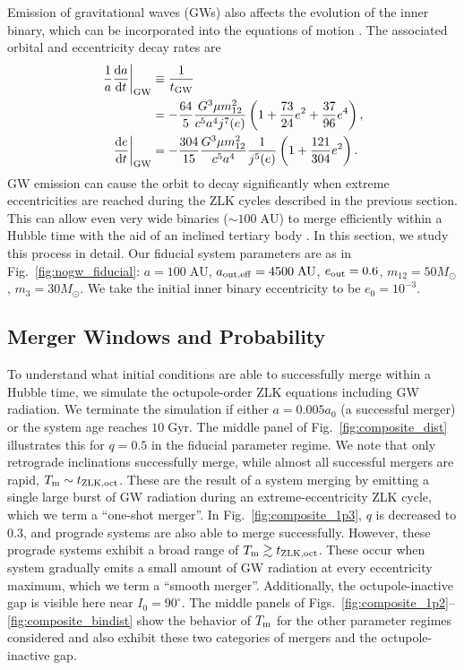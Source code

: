 \documentclass[
        fleqn,
        usenatbib,
    ]{mnras}
\newcommand*{\rd}[2]{\frac{\mathrm{d}#1}{\mathrm{d}#2}}
\newcommand*{\at}[1]{\left.#1\right|}
\newcommand*{\p}[1]{\left(#1\right)}
\begin{document}
Emission of gravitational waves (GWs) also affects the evolution of the inner
binary, which can be incorporated into the equations of motion
\citep{peters1964, LL18}. The associated orbital and eccentricity decay rates
are
\begin{align}
    \at{\frac{1}{a}\rd{a}{t}}_{\rm GW} &\equiv \frac{1}{t_{\rm GW}}\nonumber\\
        &= -\frac{64}{5}\frac{G^3 \mu m_{12}^2}{c^5a^4j^7(e)}
            \p{1 + \frac{73}{24}e^2 + \frac{37}{96}e^4}\label{eq:def_tgw},\\
    \at{\rd{e}{t}}_{\rm GW} &= -\frac{304}{15}\frac{G^3 \mu m_{12}^2}{c^5a^4}
        \frac{1}{j^{5}(e)}\p{1 + \frac{121}{304}e^2}\label{eq:dedt_gw}.
\end{align}
GW emission can cause the orbit to decay significantly when extreme
eccentricities are reached during the ZLK cycles described in the previous
section. This can allow even very wide binaries ($\sim 100\;\mathrm{AU}$) to
merge efficiently within a Hubble time with the aid of an inclined tertiary body
\citep{LL18, LL19}. In this section, we study this process in detail. Our
fiducial system parameters are as in Fig.~\ref{fig:nogw_fiducial}: $a =
100\;\mathrm{AU}$, $a_{\rm out, eff} = 4500\;\mathrm{AU}$, $e_{\rm out} = 0.6$,
$m_{12} = 50M_{\odot}$, $m_3 = 30M_{\odot}$. We take the initial inner binary
eccentricity to be $e_0 = 10^{-3}$.

\subsection{Merger Windows and Probability}\label{ss:windows}

To understand what initial conditions are able to successfully merge within a
Hubble time, we simulate the octupole-order ZLK equations including GW
radiation. We terminate the simulation if either $a = 0.005a_0$ (a successful
merger) or the system age reaches $10\;\mathrm{Gyr}$. The middle panel of
Fig.~\ref{fig:composite_dist} illustrates this for $q = 0.5$ in the fiducial
parameter regime. We note that only retrograde inclinations successfully merge,
while almost all successful mergers are rapid, $T_{\rm
m} \sim t_{\rm ZLK, oct}$. These are the result of a system merging by emitting
a single large burst of GW radiation during an extreme-eccentricity ZLK cycle,
which we term a ``one-shot merger''. In Fig.~\ref{fig:composite_1p3}, $q$ is
decreased to $0.3$, and prograde systems are also able to merge successfully.
However, these prograde systems exhibit a broad range of $T_{\rm m} \gtrsim
t_{\rm ZLK, oct}$. These occur when system gradually emits a small amount of
GW radiation at every eccentricity maximum, which we term a ``smooth merger''.
Additionally, the octupole-inactive gap is visible here near $I_0 = 90^\circ$.
The middle panels of Figs.~\ref{fig:composite_1p2}--\ref{fig:composite_bindist}
show the behavior of $T_{\rm m}$ for the other parameter regimes considered and
also exhibit these two categories of mergers and the octupole-inactive gap.
\end{document}
